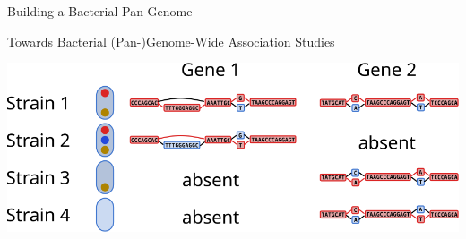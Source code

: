 \documentclass[notes=hide]{beamer}
\newcommand{\0}{\ensuremath{\mathtt{0}}}
\newcommand{\1}{\ensuremath{\mathtt{1}}}
\begin{document}
\begin{frame}{Building a Bacterial Pan-Genome}
\begin{center}
\end{center}
\end{frame}


\begin{frame}{Towards Bacterial (Pan-)Genome-Wide Association Studies}
\begin{center}
\includegraphics[width=\textwidth]{figs/bacterial-pangenome-gwas}
\end{center}
\end{frame}
\end{document}

